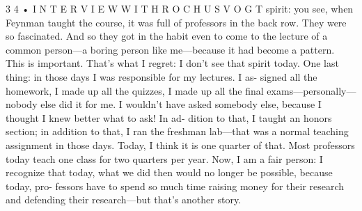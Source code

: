 \documentclass[10pt,oneside]{article}
\begin{document}
3 4 • I N T E R V I E W  W I T H  R O C H U S  V O G T spirit: you see, when Feynman taught the course, it was full of professors in the back row. They were so fascinated. And so they got in the habit even to come to the lecture of a common person---a boring person like me---because it had become a pattern. This is important. That’s what I regret: I don’t see that spirit today. One last thing: in those days I was responsible for my lectures. I as- signed all the homework, I made up all the quizzes, I made up all the final exams---personally---nobody else did it for me. I wouldn’t have asked somebody else, because I thought I knew better what to ask! In ad- dition to that, I taught an honors section; in addition to that, I ran the freshman lab---that was a normal teaching assignment in those days. Today, I think it is one quarter of that. Most professors today teach one class for two quarters per year. Now, I am a fair person: I recognize that today, what we did then would no longer be possible, because today, pro- fessors have to spend so much time raising money for their research and defending their research---but that’s another story.\par

\clearpage
{}
\end{document}
